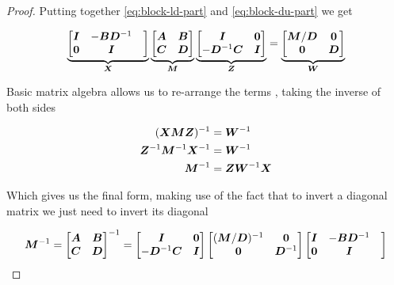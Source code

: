 \begin{proof}
Putting together \eqref{eq:block-ld-part} and \eqref{eq:block-du-part} we get

\begin{equation}
\underbrace{\begin{bmatrix} {\bm{I}} & -{\bm{B}} {\bm{D}}^{-1} & \\ {\bm{0}} & {\bm{I}} \end{bmatrix}}_{{\bm{X}}}
\underbrace{\begin{bmatrix}{\bm{A}} & {\bm{B}} \\ {\bm{C}} & {\bm{D}} \end{bmatrix}}_{{\bm{M}}}
\underbrace{\begin{bmatrix} {\bm{I}} & {\bm{0}} \\ -{\bm{D}}^{-1} {\bm{C}} & {\bm{I}} \end{bmatrix}}_{{\bm{Z}}} = 
\underbrace{\begin{bmatrix} {\bm{M}}/{\bm{D}} & {\bm{0}} \\ {\bm{0}} & {\bm{D}} \end{bmatrix}}_{{\bm{W}}}
\end{equation}

Basic matrix algebra allows us to re-arrange the terms , taking the inverse of both sides

\begin{align}
({\bm{X}} {\bm{M}} {\bm{Z}})^{-1} &= {\bm{W}}^{-1} \\
{\bm{Z}}^{-1} {\bm{M}}^{-1} {\bm{X}}^{-1} &= {\bm{W}}^{-1} \\
{\bm{M}}^{-1} &= {\bm{Z}} {\bm{W}}^{-1} {\bm{X}}
\end{align}

Which gives us the final form, making use of the fact that to invert a diagonal matrix we just need to invert its diagonal

\begin{equation} \label{eq:block-inverse}
{\bm{M}}^{-1} = \begin{bmatrix} {\bm{A}} & {\bm{B}} \\ {\bm{C}} & {\bm{D}} \end{bmatrix}^{-1} =
\begin{bmatrix} {\bm{I}} & {\bm{0}} \\ -{\bm{D}}^{-1} {\bm{C}} & {\bm{I}} \end{bmatrix}
\begin{bmatrix} ({\bm{M}}/{\bm{D}})^{-1} & {\bm{0}} \\ {\bm{0}} & {\bm{D}}^{-1} \end{bmatrix}
\begin{bmatrix} {\bm{I}} & -{\bm{B}} {\bm{D}}^{-1} & \\ {\bm{0}} & {\bm{I}} \end{bmatrix}
\end{equation}

\end{proof}



